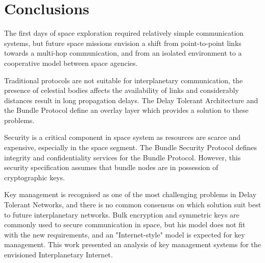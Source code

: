 \section{Conclusions}
\label{sec:con}

The first days of space exploration required relatively simple communication systems, but future space missions envision a shift from point-to-point links towards a multi-hop communication, and from an isolated environment to a cooperative model between space agencies.

Traditional protocols are not suitable for interplanetary communication, the presence of celestial bodies affects the availability of links and considerably distances result in long propagation delays. The Delay Tolerant Architecture and the Bundle Protocol define an overlay layer which provides a solution to these problems.

Security is a critical component in space system as resources are scarce and expensive, especially in the space segment. The Bundle Security Protocol defines integrity and confidentiality services for the Bundle Protocol.  However, this security specification assumes that bundle nodes are in possession of cryptographic keys. 


Key management is recognised as one of the most challenging problems in Delay Tolerant Networks, and there is no common consensus on which solution suit best to future interplanetary networks. Bulk encryption and symmetric keys are commonly used to secure communication in space, but his model does not fit with the new requirements, and an "Internet-style" model is expected for key management. This work presented an analysis of key management systems for the envisioned Interplanetary Internet. 







